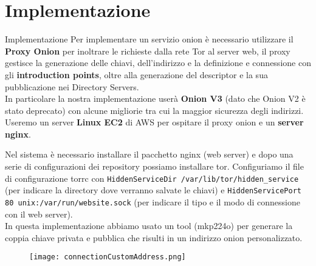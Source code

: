 \section{Implementazione}
\begin{frame}{Implementazione}
    Per implementare un servizio onion è necessario utilizzare il \textbf{Proxy Onion} per inoltrare le richieste dalla rete Tor al server web, il proxy gestisce la generazione delle chiavi, dell'indirizzo e la definizione e connessione con gli \textbf{introduction points}, oltre alla generazione del descriptor e la sua pubblicazione nei Directory Servers. \\
    In particolare la nostra implementazione userà \textbf{Onion V3} (dato che Onion V2 è stato deprecato) con alcune migliorie tra cui la maggior sicurezza degli indirizzi. \\
    Useremo un server \textbf{Linux EC2} di AWS per ospitare il proxy onion e un \textbf{server nginx}.
\end{frame}

\begin{frame}
    Nel sistema è necessario installare il pacchetto nginx (web server) e dopo una serie di configurazioni dei repository possiamo installare tor. 
    \newline
    Configuriamo il file di configurazione torrc con \lstinline{HiddenServiceDir /var/lib/tor/hidden_service} (per indicare la directory dove verranno salvate le chiavi) e \lstinline{HiddenServicePort 80 unix:/var/run/website.sock} (per indicare il tipo e il modo di connessione con il web server). \\
    In questa implementazione abbiamo usato un tool (mkp224o) per generare la coppia chiave privata e pubblica che risulti in un indirizzo onion personalizzato.
\end{frame}

\begin{frame}
    \begin{figure}
        \centering
        \texttt{[image: connectionCustomAddress.png]}
    \end{figure}
\end{frame}

